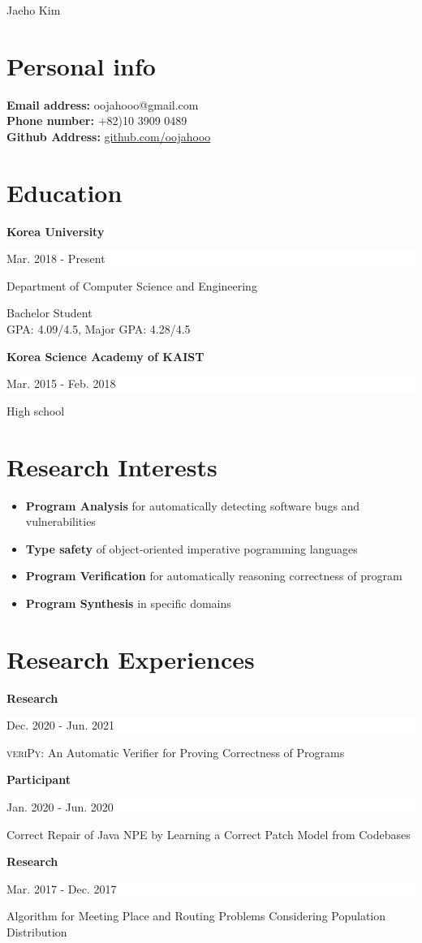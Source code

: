 \documentclass[paper=a4,fontsize=11pt]{scrartcl} %
\newcommand{\MyName}[1]{ %
                \Huge \hfill #1
                \par \normalsize \normalfont}
\newcommand{\NewPart}[1]{\section*{{#1}}}
\newcommand{\EducationEntry}[4]{
		\noindent \textbf{#1} \hfill      %
		\colorbox{White}{%
			\parbox{5cm}{%
			\hfill\color{Black}#2}} \par  %
		\noindent #3 \par        %
		\noindent\small #4 %
		\normalsize \par}
\begin{document}

\MyName{Jaeho Kim}



\NewPart{Personal info}{}
\textbf{Email address:} oojahooo@gmail.com \\
\textbf{Phone number:} +82)10 3909 0489  \\
\textbf{Github Address:} \href{https://github.com/oojahooo}{github.com/oojahooo}

\NewPart{Education}{}

\EducationEntry{Korea University}{Mar. 2018 - Present}{Department of Computer Science and Engineering}{
	Bachelor Student \\
	GPA: 4.09/4.5, Major GPA: 4.28/4.5 \\
}
\EducationEntry{Korea Science Academy of KAIST}{Mar. 2015 - Feb. 2018}{High school}{}


\NewPart{Research Interests}{}

\begin{itemize}
	\item \textbf{Program Analysis} for automatically detecting software bugs and vulnerabilities
	\item \textbf{Type safety} of object-oriented imperative pogramming languages
	\item \textbf{Program Verification} for automatically reasoning correctness of program
	\item \textbf{Program Synthesis} in specific domains
\end{itemize}

\NewPart{Research Experiences}{}

\EducationEntry{Research}{Dec. 2020 - Jun. 2021}{\textsc{veriPy}: An Automatic Verifier for Proving Correctness of Programs}{}
\EducationEntry{Participant}{Jan. 2020 - Jun. 2020}{Correct Repair of Java NPE by Learning a Correct Patch Model from Codebases}{}
\EducationEntry{Research}{Mar. 2017 - Dec. 2017}{Algorithm for Meeting Place and Routing Problems Considering Population Distribution}{}
\end{document}

